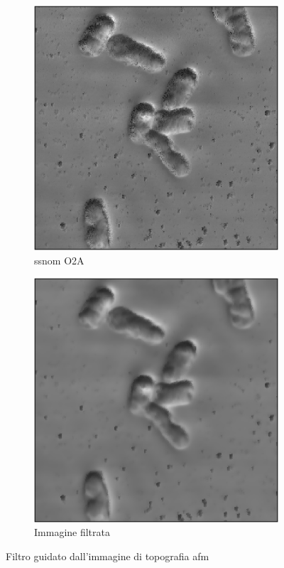 \documentclass[../main.tex]{subfiles}
\begin{document}
\begin{figure}[ht]
\begin{subfigure}{0.32\linewidth}
			\includegraphics[keepaspectratio, width=\linewidth]{images/entero_o2a.png}
			\caption{\acrshort{ssnom} O2A}
		\end{subfigure}
		\begin{subfigure}{0.32\linewidth}
			\includegraphics[keepaspectratio, width=\linewidth]{images/entero_guided.png}
			\caption{Immagine filtrata}
		\end{subfigure}
		\caption[Filtro guidato dall'immagine di topografia AFM]{
			Filtro guidato dall'immagine di topografia \acrshort{afm}}
	\end{figure}
	
\end{document}
